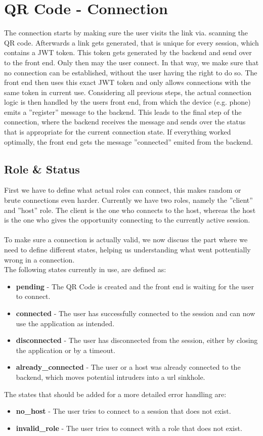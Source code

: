 \section{QR Code - Connection}
The connection starts by making sure the user visits the link via. scanning the QR code.
Afterwards a link gets generated, that is unique for every session, which contains a JWT token.
This token gets generated by the backend and send over to the front end.
Only then may the user connect.
In that way, we make sure that no connection can be established, without the user having the right to do so.
The front end then uses this exact JWT token and only allows connections with the same token in current use.
Considering all previous steps, the actual connection logic is then handled by the users front end, from which the device (e.g. phone) emits a ''register'' message to the backend.
This leads to the final step of the connection, where the backend receives the message and sends over the status that is appropriate for the current connection state.
If everything worked optimally, the front end gets the message ''connected'' emited from the backend. 
\subsection{Role \& Status}
First we have to define what actual roles can connect, this makes random or brute connections even harder.
Currently we have two roles, namely the ''client'' and ''host'' role.
The client is the one who connects to the host, whereas the host is the one who gives the opportunity connecting to the currently active session. \\ \\

To make sure a connection is actually valid, we now discuss the part where we need to define different states, helping us understanding what went pottentially wrong in a connection. \\
The following states currently in use, are defined as:
\begin{itemize}
    \item \textbf{pending} - The QR Code is created and the front end is waiting for the user to connect.
    \item \textbf{connected} - The user has successfully connected to the session and can now use the application as intended.
    \item \textbf{disconnected} - The user has disconnected from the session, either by closing the application or by a timeout.
    \item \textbf{already\_connected} - The user or a host was already connected to the backend, which moves potential intruders into a url sinkhole.
\end{itemize}
The states that should be added for a more detailed error handling are:
\begin{itemize}
    \item \textbf{no\_host} - The user tries to connect to a session that does not exist.
    \item \textbf{invalid\_role} - The user tries to connect with a role that does not exist.
\end{itemize}

